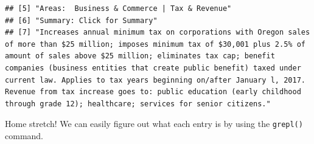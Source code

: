 \documentclass{article}\usepackage[]{graphicx}\usepackage[]{color}
\makeatletter
\newenvironment{kframe}{%
 \def\at@end@of@kframe{}%
 \ifinner\ifhmode%
  \def\at@end@of@kframe{\end{minipage}}%
  \begin{minipage}{\columnwidth}%
 \fi\fi%
 \def\FrameCommand##1{\hskip\@totalleftmargin \hskip-\fboxsep
 \colorbox{shadecolor}{##1}\hskip-\fboxsep
     \hskip-\linewidth \hskip-\@totalleftmargin \hskip\columnwidth}%
 \MakeFramed {\advance\hsize-\width
   \@totalleftmargin\z@ \linewidth\hsize
   \@setminipage}}%
 {\par\unskip\endMakeFramed%
 \at@end@of@kframe}
\newenvironment{knitrout}{}{} %
\makeatother
\begin{document}
\begin{knitrout}
\begin{kframe}
\begin{verbatim}
## [5] "Areas:  Business & Commerce | Tax & Revenue"                                                                                                                                                                                                                                                                                                                                                                                                                                     
## [6] "Summary: Click for Summary"                                                                                                                                                                                                                                                                                                                                                                                                                                                      
## [7] "Increases annual minimum tax on corporations with Oregon sales of more than $25 million; imposes minimum tax of $30,001 plus 2.5% of amount of sales above $25 million; eliminates tax cap; benefit companies (business entities that create public benefit) taxed under current law. Applies to tax years beginning on/after January l, 2017. Revenue from tax increase goes to: public education (early childhood through grade 12); healthcare; services for senior citizens."
\end{verbatim}
\end{kframe}
\end{knitrout}

Home stretch! We can easily figure out what each entry is by using the \verb!grepl()! command.
\end{document}
